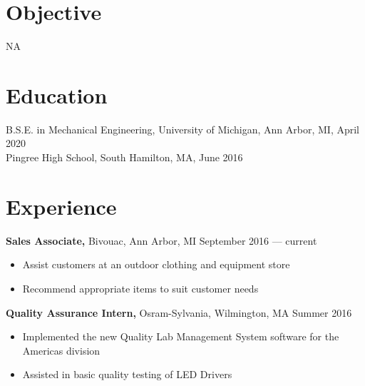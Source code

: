 \documentclass[margin]{res}
\begin{document}
 
 
 
\address{{\bf Present Address} \\ 1503 Washington Heights \\ 3418 Butler House, Mary Markley Hall \\ Ann Arbor, MI 48109  \\ (978) 873-7207 }
\address{{\bf Permanent Address} \\ 1499 Salem Street \\ North Andover, MA 01845 \\ (978) 725-4887 }

 
\begin{resume} 
	 
	\section{Objective} 
	NA
	
	\section{Education} 
	B.S.E. in Mechanical Engineering, University of Michigan, Ann Arbor, MI, April 2020 \\
	Pingree High School, South Hamilton, MA, June 2016
	 
	
	\section{Experience}
	{\bf Sales Associate,} Bivouac, Ann Arbor, MI \hfill September 2016 --- current
	\begin{itemize} \itemsep -2pt  %
		\item Assist customers at an outdoor clothing and equipment store
		\item Recommend appropriate items to suit customer needs
	\end{itemize}
	 
	{\bf Quality Assurance Intern,} Osram-Sylvania, Wilmington, MA \hfill Summer 2016
	\begin{itemize} \itemsep -2pt %
		\item Implemented the new Quality Lab Management System software for the Americas division
		\item Assisted in basic quality testing of LED Drivers 
	\end{itemize}
	

\end{resume}
\end{document}
